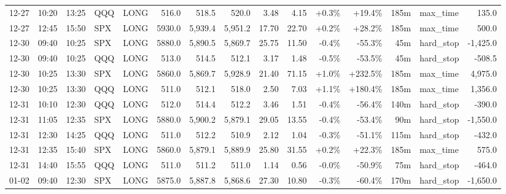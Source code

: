 \documentclass[11pt,a4paper,twoside]{article}
\begin{document}
\begin{landscape}
\begin{center}
\begin{longtable}{>{\color{txtmain}}l l l l l r r r r r r r r >{\color{txtmain}}l r}
12-27 & 10:20 & 13:25 & QQQ & LONG & 516.0 & 518.5 & 520.0 & 3.48 & 4.15 & \textcolor{wingreen}{+0.3\%} & \textcolor{wingreen}{+19.4\%} & 185m & max\_time & \textcolor{wingreen}{135.0} \\
12-27 & 12:45 & 15:50 & SPX & LONG & 5930.0 & 5,939.4 & 5,951.2 & 17.70 & 22.70 & \textcolor{wingreen}{+0.2\%} & \textcolor{wingreen}{+28.2\%} & 185m & max\_time & \textcolor{wingreen}{500.0} \\
12-30 & 09:40 & 10:25 & SPX & LONG & 5880.0 & 5,890.5 & 5,869.7 & 25.75 & 11.50 & \textcolor{lossred}{-0.4\%} & \textcolor{lossred}{-55.3\%} & 45m & hard\_stop & \textcolor{lossred}{-1,425.0} \\
12-30 & 09:40 & 10:25 & QQQ & LONG & 513.0 & 514.5 & 512.1 & 3.17 & 1.48 & \textcolor{lossred}{-0.5\%} & \textcolor{lossred}{-53.5\%} & 45m & hard\_stop & \textcolor{lossred}{-508.5} \\
12-30 & 10:25 & 13:30 & SPX & LONG & 5860.0 & 5,869.7 & 5,928.9 & 21.40 & 71.15 & \textcolor{wingreen}{+1.0\%} & \textcolor{wingreen}{+232.5\%} & 185m & max\_time & \textcolor{wingreen}{4,975.0} \\
12-30 & 10:25 & 13:30 & QQQ & LONG & 511.0 & 512.1 & 518.0 & 2.50 & 7.03 & \textcolor{wingreen}{+1.1\%} & \textcolor{wingreen}{+180.4\%} & 185m & max\_time & \textcolor{wingreen}{1,356.0} \\
12-31 & 10:10 & 12:30 & QQQ & LONG & 512.0 & 514.4 & 512.2 & 3.46 & 1.51 & \textcolor{lossred}{-0.4\%} & \textcolor{lossred}{-56.4\%} & 140m & hard\_stop & \textcolor{lossred}{-390.0} \\
12-31 & 11:05 & 12:35 & SPX & LONG & 5880.0 & 5,900.2 & 5,879.1 & 29.05 & 13.55 & \textcolor{lossred}{-0.4\%} & \textcolor{lossred}{-53.4\%} & 90m & hard\_stop & \textcolor{lossred}{-1,550.0} \\
12-31 & 12:30 & 14:25 & QQQ & LONG & 511.0 & 512.2 & 510.9 & 2.12 & 1.04 & \textcolor{lossred}{-0.3\%} & \textcolor{lossred}{-51.1\%} & 115m & hard\_stop & \textcolor{lossred}{-432.0} \\
12-31 & 12:35 & 15:40 & SPX & LONG & 5860.0 & 5,879.1 & 5,889.9 & 25.80 & 31.55 & \textcolor{wingreen}{+0.2\%} & \textcolor{wingreen}{+22.3\%} & 185m & max\_time & \textcolor{wingreen}{575.0} \\
12-31 & 14:40 & 15:55 & QQQ & LONG & 511.0 & 511.2 & 511.0 & 1.14 & 0.56 & \textcolor{lossred}{-0.0\%} & \textcolor{lossred}{-50.9\%} & 75m & hard\_stop & \textcolor{lossred}{-464.0} \\
01-02 & 09:40 & 12:30 & SPX & LONG & 5875.0 & 5,887.8 & 5,868.6 & 27.30 & 10.80 & \textcolor{lossred}{-0.3\%} & \textcolor{lossred}{-60.4\%} & 170m & hard\_stop & \textcolor{lossred}{-1,650.0} \\

\end{longtable}
\end{center}
\end{landscape}
\end{document}

